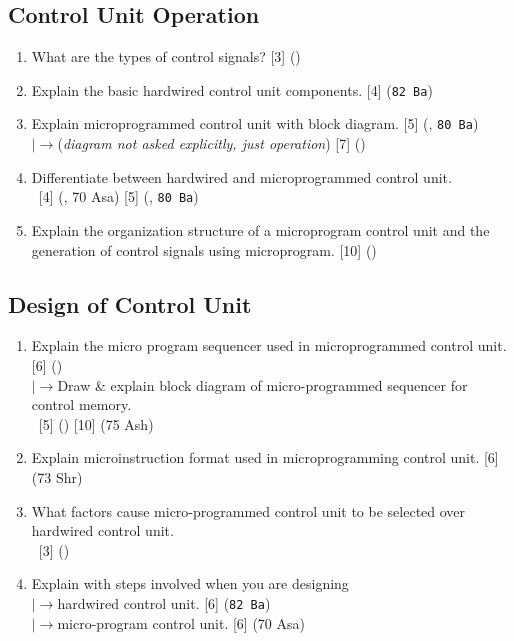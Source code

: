 \documentclass[12pt]{article}
\newcommand{\lb}{\\$\left|\rightarrow\right.$}
\newcommand{\enter}{\\\textcolor{white}{1}}
\begin{document}
	\subsection{Control Unit Operation}
		\begin{enumerate}[noitemsep, topsep=0pt]
			\item What are the types of control signals? \hfill [3] ()
			
			\item Explain the basic hardwired control unit components. \hfill [4] (\texttt{82 Ba})
			
			\item Explain microprogrammed control unit with block diagram. \hfill [5] (, \texttt{80 Ba})
			\lb (\textit{diagram not asked explicitly, just operation}) \hfill [7] ()
			
			\item Differentiate between hardwired and microprogrammed control unit. 
			\enter\hfill [4] (, 70 Asa) [5] (, \texttt{80 Ba})
			
			\item Explain the organization structure of a microprogram control unit and the generation of control signals using microprogram. \hfill [10] ()
		\end{enumerate}
	
	\subsection{Design of Control Unit}
		\begin{enumerate}[noitemsep, topsep=0pt]
			\item Explain the micro program sequencer used in microprogrammed control unit. \hfill [6] ()	
			\lb Draw \& explain block diagram of micro-programmed sequencer for control memory. 
			\enter\hfill [5] () [10] (75 Ash)
			
			\item Explain microinstruction format used in microprogramming control unit. \hfill [6] (73 Shr)
			
			\item What factors cause micro-programmed control unit to be selected over hardwired control unit.
			\enter\hfill [3] ()
			
			\item Explain with steps involved when you are designing 
			\lb hardwired control unit. \hfill [6] (\texttt{82 Ba})
			\lb micro-program control unit. \hfill [6] (70 Asa)
		\end{enumerate}
\end{document}
